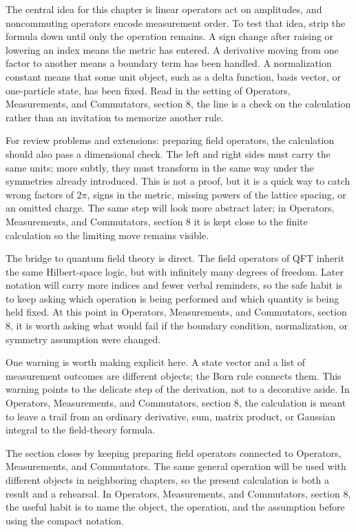 The central idea for this chapter is linear operators act on amplitudes, and noncommuting operators encode measurement order.  To test that idea, strip the formula down until only the operation remains.  A sign change after raising or lowering an index means the metric has entered.  A derivative moving from one factor to another means a boundary term has been handled.  A normalization constant means that some unit object, such as a delta function, basis vector, or one-particle state, has been fixed.  Read in the setting of Operators, Measurements, and Commutators, section 8, the line is a check on the calculation rather than an invitation to memorize another rule.

For review problems and extensions: preparing field operators, the calculation should also pass a dimensional check.  The left and right sides must carry the same units; more subtly, they must transform in the same way under the symmetries already introduced.  This is not a proof, but it is a quick way to catch wrong factors of \(2\pi\), signs in the metric, missing powers of the lattice spacing, or an omitted charge.  The same step will look more abstract later; in Operators, Measurements, and Commutators, section 8 it is kept close to the finite calculation so the limiting move remains visible.

The bridge to quantum field theory is direct.  The field operators of QFT inherit the same Hilbert-space logic, but with infinitely many degrees of freedom.  Later notation will carry more indices and fewer verbal reminders, so the safe habit is to keep asking which operation is being performed and which quantity is being held fixed.  At this point in Operators, Measurements, and Commutators, section 8, it is worth asking what would fail if the boundary condition, normalization, or symmetry assumption were changed.

One warning is worth making explicit here.  A state vector and a list of measurement outcomes are different objects; the Born rule connects them.  This warning points to the delicate step of the derivation, not to a decorative aside.  In Operators, Measurements, and Commutators, section 8, the calculation is meant to leave a trail from an ordinary derivative, sum, matrix product, or Gaussian integral to the field-theory formula.

The section closes by keeping preparing field operators connected to Operators, Measurements, and Commutators.  The same general operation will be used with different objects in neighboring chapters, so the present calculation is both a result and a rehearsal.  In Operators, Measurements, and Commutators, section 8, the useful habit is to name the object, the operation, and the assumption before using the compact notation.



